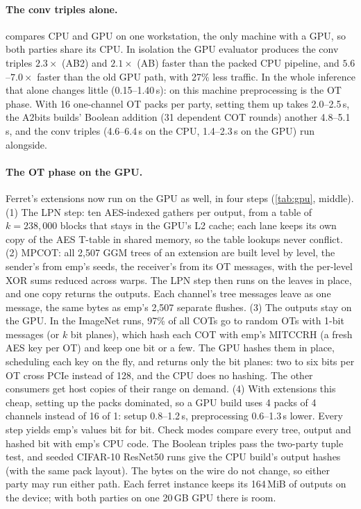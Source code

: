 \documentclass[10pt,a4paper]{article}
\newcommand{\s}{\,s\xspace}
\begin{document}
\paragraph{The conv triples alone.}  compares CPU and GPU on one workstation, the only machine with a GPU,
so both parties share its CPU. In isolation the GPU evaluator produces the conv triples $2.3\times$ (AB2) and $2.1\times$
(AB) faster than the packed CPU pipeline, and $5.6$--$7.0\times$ faster than the old GPU path, with 27\% less traffic. In
the whole inference that alone changes little (0.15--1.40\s): on this machine preprocessing is the OT phase. With 16
one-channel OT packs per party, setting them up takes 2.0--2.5\s, the A2bits builds' Boolean addition (31 dependent COT
rounds) another 4.8--5.1\s, and the conv triples (4.6--6.4\s on the CPU, 1.4--2.3\s on the GPU) run alongside.

\paragraph{The OT phase on the GPU.} Ferret's extensions now run on the GPU as well, in four steps
(\cref{tab:gpu}, middle). (1) The LPN step: ten AES-indexed gathers per output, from a table of
$k = 238{,}000$ blocks that stays in the GPU's L2 cache; each lane keeps its own copy of the AES T-table in shared memory,
so the table lookups never conflict. (2) MPCOT: all 2{,}507 GGM trees of an extension are built level by level, the
sender's from emp's seeds, the receiver's from its OT messages, with the per-level XOR sums reduced across warps. The LPN
step then runs on the leaves in place, and one copy returns the outputs. Each channel's tree messages leave as one
message, the same bytes as emp's 2{,}507 separate flushes. (3) The outputs stay on the GPU. In the ImageNet runs, 97\% of
all COTs go to random OTs with 1-bit messages (or $k$ bit planes), which hash each COT with emp's MITCCRH (a fresh AES
key per OT) and keep one bit or a few. The GPU hashes them in place, scheduling each key on the fly, and returns only the
bit planes: two to six bits per OT cross PCIe instead of 128, and the CPU does no hashing. The other consumers get host copies of their
range on demand. (4) With extensions this cheap, setting up the packs dominated, so a GPU build uses 4 packs of 4
channels instead of 16 of 1: setup 0.8--1.2\s, preprocessing 0.6--1.3\s lower. Every step yields emp's values bit for
bit. Check modes compare every tree, output and hashed bit with emp's CPU code. The Boolean triples pass the two-party
tuple test, and seeded CIFAR-10 ResNet50 runs give the CPU build's output hashes (with the same pack layout). The bytes
on the wire do not change, so either party may run either path. Each ferret instance keeps its 164\,MiB of outputs on
the device; with both parties on one 20\,GB GPU there is room.
\end{document}
